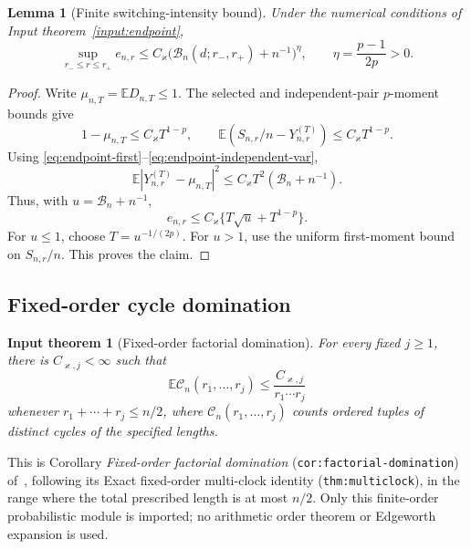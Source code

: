 \documentclass[11pt]{article}
\numberwithin{equation}{section}
\newcommand{\E}{\mathbb E}
\newcommand{\cC}{\mathcal C}
\newtheorem{lemma}[theorem]{Lemma}
\newtheorem{inputtheorem}[theorem]{Input theorem}
\theoremstyle{definition}
\theoremstyle{remark}
\begin{document}
\begin{lemma}[Finite switching-intensity bound]\label{lem:finite-intensity}
Under the numerical conditions of Input theorem~\ref{input:endpoint},
\begin{equation}\label{eq:finite-intensity}
 \sup_{r_-\le r\le r_+} e_{n,r}
 \le C_\varkappa\bigl(\mathcal B_n(d;r_-,r_+)+n^{-1}\bigr)^\eta,
 \qquad \eta=\frac{p-1}{2p}>0.
\end{equation}
\end{lemma}
\begin{proof}
Write $\mu_{n,T}=\E D_{n,T}\le1$.  The selected and independent-pair
$p$-moment bounds give
\[
 1-\mu_{n,T}\le C_\varkappa T^{1-p},\qquad
 \E(S_{n,r}/n-Y_{n,r}^{(T)})\le C_\varkappa T^{1-p}.
\]
Using \eqref{eq:endpoint-first}--\eqref{eq:endpoint-independent-var},
\[
 \E|Y_{n,r}^{(T)}-\mu_{n,T}|^2
 \le C_\varkappa T^2(\mathcal B_n+n^{-1}).
\]
Thus, with $u=\mathcal B_n+n^{-1}$,
\[
 e_{n,r}\le C_\varkappa\{T\sqrt u+T^{1-p}\}.
\]
For $u\le1$, choose $T=u^{-1/(2p)}$.  For $u>1$, use the uniform
first-moment bound on $S_{n,r}/n$.  This proves the claim.
\end{proof}

\subsection{Fixed-order cycle domination}

\begin{inputtheorem}[Fixed-order factorial domination]
\label{input:factorial-dom}
For every fixed $j\ge1$, there is $C_{\varkappa,j}<\infty$ such that
\begin{equation}\label{eq:factorial-dom}
 \E\cC_n(r_1,\ldots,r_j)
 \le\frac{C_{\varkappa,j}}{r_1\cdots r_j}
\end{equation}
whenever $r_1+\cdots+r_j\le n/2$, where
$\cC_n(r_1,\ldots,r_j)$ counts ordered tuples of distinct cycles of the
specified lengths.
\end{inputtheorem}

This is Corollary \emph{Fixed-order factorial domination}
(\texttt{cor:factorial-domination}) of~\cite{LongOrderEdgeworth2026},
following its Exact fixed-order multi-clock identity
(\texttt{thm:multiclock}), in the range where
the total prescribed length is at most $n/2$.  Only this finite-order
probabilistic module is imported; no arithmetic order theorem or
Edgeworth expansion is used.
\end{document}
